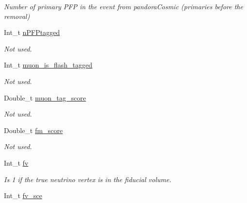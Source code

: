 \begin{DoxyCompactItemize}
\begin{DoxyCompactList}\small\item\em Number of primary P\-F\-P in the event from pandora\-Cosmic (primaries before the removal) \end{DoxyCompactList}\item 
\hypertarget{classUBXSecEvent_a64e18b32773515202fcb167d1818133b}{Int\-\_\-t \hyperlink{classUBXSecEvent_a64e18b32773515202fcb167d1818133b}{n\-P\-F\-Ptagged}}\label{classUBXSecEvent_a64e18b32773515202fcb167d1818133b}

\begin{DoxyCompactList}\small\item\em Not used. \end{DoxyCompactList}\item 
\hypertarget{classUBXSecEvent_a33857278922a2779d3daaf30624a2462}{Int\-\_\-t \hyperlink{classUBXSecEvent_a33857278922a2779d3daaf30624a2462}{muon\-\_\-is\-\_\-flash\-\_\-tagged}}\label{classUBXSecEvent_a33857278922a2779d3daaf30624a2462}

\begin{DoxyCompactList}\small\item\em Not used. \end{DoxyCompactList}\item 
\hypertarget{classUBXSecEvent_a492e788ae84c0ac6c847b7ba95656706}{Double\-\_\-t \hyperlink{classUBXSecEvent_a492e788ae84c0ac6c847b7ba95656706}{muon\-\_\-tag\-\_\-score}}\label{classUBXSecEvent_a492e788ae84c0ac6c847b7ba95656706}

\begin{DoxyCompactList}\small\item\em Not used. \end{DoxyCompactList}\item 
\hypertarget{classUBXSecEvent_af45f0efa722a046884ec4f6c36b77d9a}{Double\-\_\-t \hyperlink{classUBXSecEvent_af45f0efa722a046884ec4f6c36b77d9a}{fm\-\_\-score}}\label{classUBXSecEvent_af45f0efa722a046884ec4f6c36b77d9a}

\begin{DoxyCompactList}\small\item\em Not used. \end{DoxyCompactList}\item 
\hypertarget{classUBXSecEvent_a3b05f41e3b302767d921996aed6f0d87}{Int\-\_\-t \hyperlink{classUBXSecEvent_a3b05f41e3b302767d921996aed6f0d87}{fv}}\label{classUBXSecEvent_a3b05f41e3b302767d921996aed6f0d87}

\begin{DoxyCompactList}\small\item\em Is 1 if the true neutrino vertex is in the fiducial volume. \end{DoxyCompactList}\item 
\hypertarget{classUBXSecEvent_afec3a80a452246fad1cbe8482dcf9d59}{Int\-\_\-t \hyperlink{classUBXSecEvent_afec3a80a452246fad1cbe8482dcf9d59}{fv\-\_\-sce}}\label{classUBXSecEvent_afec3a80a452246fad1cbe8482dcf9d59}


\end{DoxyCompactItemize}
